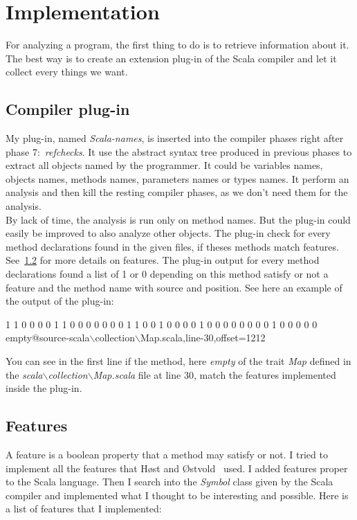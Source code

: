 \documentclass[12pt]{article}
\newcommand{\code}[1]{{\fontfamily{phv}\selectfont \small{\begin{tabbing} #1 \end{tabbing}}}}
\begin{document}
\section {Implementation}
For analyzing a program, the first thing to do is to retrieve information about it. The best way is to create an extension plug-in of the Scala compiler and let it collect every things we want.

\subsection{Compiler plug-in}
My plug-in, named \textit{Scala-names}, is inserted into the compiler phases right after phase 7:~\textit{refchecks}. It use the abstract syntax tree produced in previous phases to extract all objects named by the programmer. It could be variables names, objects names, methods names, parameters names or types names. It perform an analysis and then kill the resting compiler phases, as we don't need them for the analysis.\\

By lack of time, the analysis is run only on method names. But the plug-in could easily be improved to also analyze other objects.
The plug-in check for every method declarations found in the given files, if theses methods match features. See~\ref{features} for more details on features. The plug-in output for every method declarations found a list of 1 or 0 depending on this method satisfy or not a feature and the method name with source and position. See here an example of the output of the plug-in:
\code{1 1 0 0 0 0 1 1 0 0 0 0 0 0 0 1 1 0 0 1 0 0 0 0 1 0 0 0 0 0 0 0 0 1 0 0 0 0 0 \\empty@source-scala$\backslash$collection$\backslash$Map.scala,line-30,offset=1212}
You can see in the first line if the method, here \textit{empty} of the trait \textit{Map} defined in the \textit{scala$\backslash$collection$\backslash$Map.scala} file at line 30, match the features implemented inside the plug-in.
\subsection{Features}
\label{features}
A feature is a boolean property that a method may satisfy or not. I tried to implement all the features that H{\o}st and {\O}stvold~\cite{DebugMN} used. I added features proper to the Scala language. Then I search into the \textit{Symbol} class given by the Scala compiler and implemented what I thought to be interesting and possible. Here is a list of features that I implemented:
\end{document}
